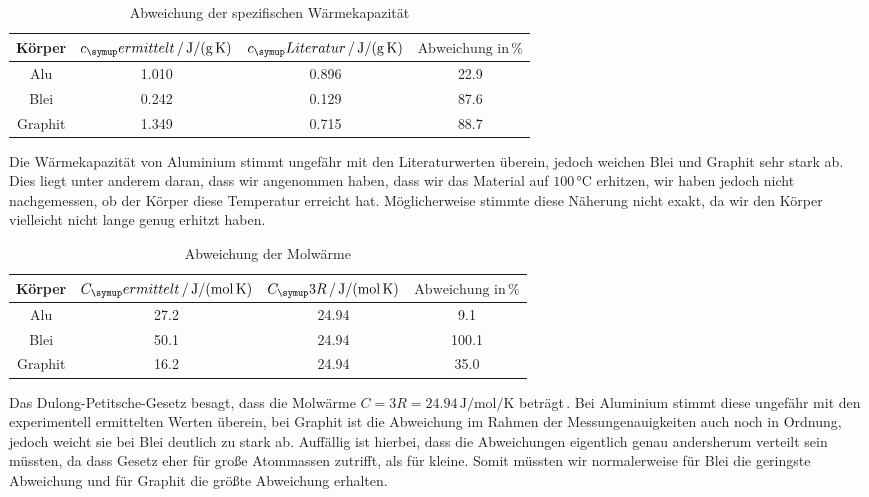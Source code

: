 \begin{table}
  \centering
  \begin{tabular}{c c c c}
    \toprule
    Körper & $c_\su{ermittelt}\,/\,\si{\joule\per\gram\per\kelvin}$ &
    $c_\su{Literatur}\,/\,\si{\joule\per\gram\per\kelvin}$\cite{bleialu} & $\text{Abweichung in}\,\%$ \\
    \midrule
    Alu & 1.010 & 0.896 & 22.9 \\
    Blei & 0.242 & 0.129 & 87.6 \\
    Graphit & 1.349 & 0.715 & 88.7 \\
    \bottomrule
  \end{tabular}
  \caption{Abweichung der spezifischen Wärmekapazität}
\end{table}
Die Wärmekapazität von Aluminium stimmt ungefähr mit den Literaturwerten überein,
jedoch weichen Blei und Graphit sehr stark ab. Dies liegt unter anderem daran,
dass wir angenommen haben, dass wir das Material auf $100\,\si{\celsius}$ erhitzen,
wir haben jedoch nicht nachgemessen, ob der Körper diese Temperatur erreicht hat.
Möglicherweise stimmte diese Näherung nicht exakt, da wir den Körper vielleicht
nicht lange genug erhitzt haben.

\begin{table}
  \centering
  \begin{tabular}{c c c c}
    \toprule
    Körper & $C_\su{ermittelt}\,/\,\si{\joule\per\mol\per\kelvin}$ &
    $C_\su{3R}\,/\,\si{\joule\per\mol\per\kelvin}$ & $\text{Abweichung in} \,\%$ \\
    \midrule
    Alu & 27.2 & 24.94 & 9.1 \\
    Blei & 50.1 & 24.94 & 100.1 \\
    Graphit & 16.2 & 24.94 & 35.0 \\
    \bottomrule
  \end{tabular}
  \caption{Abweichung der Molwärme}
\end{table}
Das Dulong-Petitsche-Gesetz besagt, dass die Molwärme $ C = 3 R = 24.94 \,\si{\joule\per\mol\per\kelvin}$
beträgt\,\cite{chemie}. Bei Aluminium stimmt diese ungefähr mit den experimentell
ermittelten Werten überein, bei Graphit ist die Abweichung im Rahmen der Messungenauigkeiten
auch noch in Ordnung, jedoch weicht sie bei Blei deutlich zu stark ab. Auffällig ist hierbei,
dass die Abweichungen eigentlich genau andersherum verteilt sein müssten, da dass Gesetz
eher für große Atommassen zutrifft, als für kleine. Somit müssten wir normalerweise für Blei
die geringste Abweichung und für Graphit die größte Abweichung erhalten.

